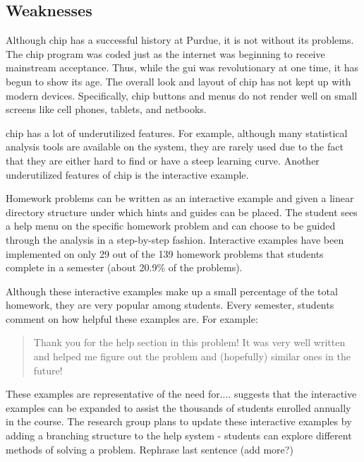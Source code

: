 \subsection*{Weaknesses}

Although \gls{chip} has a successful history at Purdue, it is not without its problems. The \gls{chip} program was coded just as the internet was beginning to receive mainstream acceptance. Thus, while the \gls{gui} was revolutionary at one time, it has begun to show its age. The overall look and layout of \gls{chip} has not kept up with modern devices. Specifically, \gls{chip} buttons and menus do not render well on small screens like cell phones, tablets, and netbooks.

\gls{chip} has a lot of underutilized features. For example, although many statistical analysis tools are available on the system, they are rarely used due to the fact that they are either hard to find or have a steep learning curve. Another underutilized features of \gls{chip} is the interactive example.

Homework problems can be written as an interactive example and given a linear directory structure under which hints and guides can be placed. The student sees a help menu on the specific homework problem and can choose to be guided through the analysis in a step-by-step fashion. Interactive examples have been implemented on only 29 out of the 139 homework problems that students complete in a semester (about 20.9\% of the problems).


Although these interactive examples make up a small percentage of the total homework, they are very popular among students. Every semester, students comment on how helpful these examples are. For example:

\begin{quotation}
Thank you for the help section in this problem! It was very well written and helped me figure out the problem and (hopefully) similar ones in the future!
\end{quotation}

%
%

These examples are representative of the need for.... suggests that the interactive examples can be expanded to assist the thousands of students enrolled annually in the course. The research group plans to update these interactive examples by adding a branching structure to the help system - students can explore different methods of solving a problem.
Rephrase last sentence (add more?)

